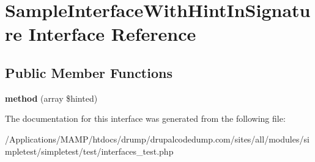 \hypertarget{interface_sample_interface_with_hint_in_signature}{
\section{SampleInterfaceWithHintInSignature Interface Reference}
\label{interface_sample_interface_with_hint_in_signature}
}
\subsection*{Public Member Functions}
\begin{DoxyCompactItemize}
\item 
\hypertarget{interface_sample_interface_with_hint_in_signature_a116f7adb301057adb4fb0f5928af71e4}{
{\bfseries method} (array \$hinted)}
\label{interface_sample_interface_with_hint_in_signature_a116f7adb301057adb4fb0f5928af71e4}

\end{DoxyCompactItemize}


The documentation for this interface was generated from the following file:\begin{DoxyCompactItemize}
\item 
/Applications/MAMP/htdocs/drump/drupalcodedump.com/sites/all/modules/simpletest/simpletest/test/interfaces\_\-test.php\end{DoxyCompactItemize}
